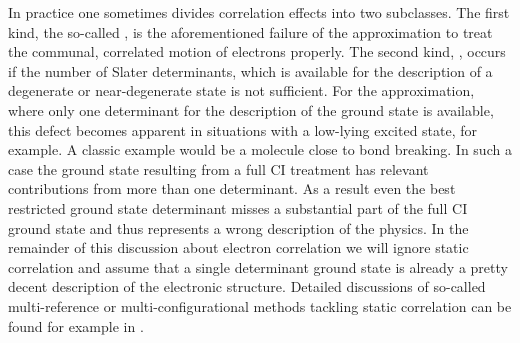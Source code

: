 In practice one sometimes divides correlation effects
into two subclasses.
The first kind, the so-called ,
is the aforementioned failure of the \HF approximation
to treat the communal, correlated motion of electrons properly.
The second kind, ,
occurs if the number of Slater determinants,
which is available for the description of a degenerate or near-degenerate
state is not sufficient.
For the \HF approximation,
where only one determinant for the description of the ground state
is available,
this defect becomes apparent in situations
with a low-lying excited state, for example.
A classic example would be a molecule close to bond breaking.
In such a case the ground state resulting from a full CI treatment
has relevant contributions from more than one determinant.
As a result even the best restricted \HF ground state determinant misses a substantial
part of the full CI ground state and thus represents
a wrong description of the physics.
In the remainder of this discussion about electron correlation
we will ignore static correlation and assume that a single determinant
\HF ground state is already a pretty decent description of the electronic structure.
Detailed discussions of so-called multi-reference
or multi-configurational methods tackling static correlation
can be found for example in \cite{McWeeny1985,Fischer1986,Jensen2007book,Helgaker2013}.

